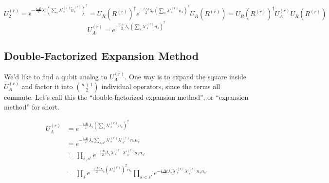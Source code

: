 \begin{equation}
    U_2^{(r)} = e^{-\frac{i\Delta t}{2}\lambda_r\left(\sum_s \lambda'^{(r)}_s \tilde{n}^{(r)}_s\right)^2} = U_R(R^{(r)})^\dag e^{-\frac{i\Delta t}{2}\lambda_r\left(\sum_s \lambda'^{(r)}_s n_s\right)^2}U_R(R^{(r)}) = U_R(R^{(r)})^\dag U_A^{(r)}U_R(R^{(r)})
    \label{eq: U_2^r}
\end{equation}
\begin{equation}
    U_A^{(r)} = e^{-\frac{i\Delta t}{2}\lambda_r\left(\sum_s \lambda'^{(r)}_s n_s\right)^2}
\end{equation}

\subsection{Double-Factorized Expansion Method}

We'd like to find a qubit analog to $U_A^{(r)}$. One way is to expand the square inside $U_A^{(r)}$ and factor it into ${n + 1 \choose 2}$ individual operators, since the terms all commute. Let's call this the ``double-factorized expansion method'', or ``expansion method'' for short.

\begin{equation}
    \begin{split}
        U_A^{(r)} &= e^{-\frac{i\Delta t}{2}\lambda_r\left(\sum_s \lambda'^{(r)}_s n_s\right)^2} \\
        &= e^{-\frac{i\Delta t}{2}\lambda_r\sum_{s, s'} \lambda'^{(r)}_s\lambda'^{(r)}_{s'} n_sn_{s'}} \\
        &= \prod_{s, s'} e^{-\frac{i\Delta t}{2}\lambda_r\lambda'^{(r)}_s\lambda'^{(r)}_{s'} n_sn_{s'}} \\
        &= \prod_s e^{-\frac{i\Delta t}{2}\lambda_s(\lambda'^{(r)}_s)^2 n_s}\prod_{s < s'} e^{-i\Delta t\lambda_r\lambda'^{(r)}_s\lambda'^{(r)}_{s'} n_sn_{s'}}
        \label{eq: expansion}
    \end{split}
\end{equation}

